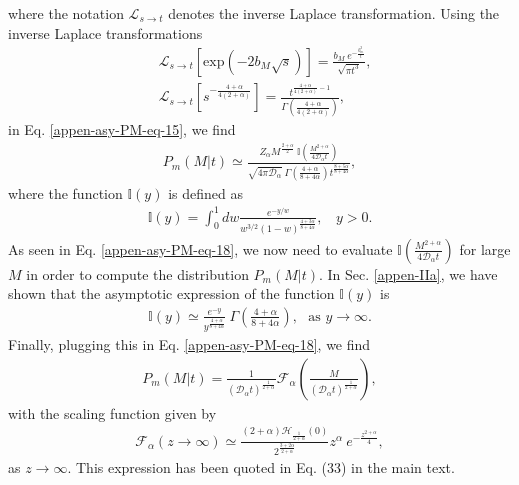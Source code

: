 \documentclass[superscriptaddress,amsmath,amssymb,aps,onecolumn]{revtex4}
\begin{document}
where the notation $\mathcal{L}_{s \to t}$ denotes the inverse Laplace transformation. Using the inverse Laplace transformations
\begin{align}
&\mathcal{L}_{s \to t}\left[ \text{exp} \left( -2b_M \sqrt{s} \right) \right] = \frac{b_M~e^{-\frac{b_m^2}{t}}}{\sqrt{\pi t^3}},
\label{appen-asy-PM-eq-16} \\
&\mathcal{L}_{s \to t} \left[ s^{-\frac{4+\alpha}{4(2+\alpha)}}\right] = \frac{t^{\frac{4+\alpha}{4(2+\alpha)}-1}}{\Gamma\left( \frac{4+\alpha}{4(2+\alpha)} \right) }, \label{appen-asy-PM-eq-17}
\end{align}
in Eq. \eqref{appen-asy-PM-eq-15}, we find
\begin{align}
P_m(M|t) \simeq \frac{Z_{\alpha} M^{\frac{2+\alpha}{2}}~\mathbb{I} \left( \frac{M^{2+\alpha}}{4 \mathcal{D}_{\alpha} t} \right)}{\sqrt{4 \pi \mathcal{D}_{\alpha}} ~\Gamma \left(\frac{4+\alpha}{8+4 \alpha} \right) t^{\frac{8+5\alpha}{8+4 \alpha}}}, 
\label{appen-asy-PM-eq-18}
\end{align} 
where the function $\mathbb{I}(y)$ is defined as
\begin{align}
\mathbb{I}(y) = \int _{0}^{1} dw \frac{e^{-y/w}}{w^{3/2} (1-w)^{\frac{4+3 \alpha}{8+4 \alpha}}},~~~~y>0.
\label{appen-asy-PM-eq-19}
\end{align}
As seen in Eq. \eqref{appen-asy-PM-eq-18}, we now need to evaluate $\mathbb{I} \left( \frac{M^{2+\alpha}}{4 \mathcal{D}_{\alpha} t} \right)$ for large $M$ in order to compute the distribution $P_m(M|t)$. In Sec. \ref{appen-IIa}, we have shown that the asymptotic expression of the function $\mathbb{I}(y)$ is
\begin{align}
\mathbb{I}(y) \simeq \frac{e^{-y}}{y^{\frac{4+\alpha}{8+4 \alpha}}}~\Gamma \left(\frac{4+\alpha}{8+4 \alpha} \right),~~~\text{as }y \to \infty.
\label{appen-asy-PM-eq-20}
\end{align}
Finally, plugging this in Eq. \eqref{appen-asy-PM-eq-18}, we find
\begin{align}
P_m(M|t) = \frac{1}{\left( \mathcal{D}_{\alpha} t\right)^{\frac{1}{2+\alpha}}} \mathcal{F}_{\alpha} \left( \frac{M}{\left( \mathcal{D}_{\alpha} t\right)^{\frac{1}{2+\alpha}}} \right),
\label{appen-asy-PM-eq-21}
\end{align}
with the scaling function given by
\begin{align}
\mathcal{F}_{\alpha} \left( z \to \infty \right)\simeq \frac{(2+\alpha)\mathcal{H}_{\frac{1}{2+\alpha}}(0) }{2^{\frac{3+2\alpha}{2+\alpha}}}  z^{\alpha} ~e^{-\frac{z^{2+\alpha}}{4} },
\label{appen-asy-PM-eq-22}
\end{align}
as $z \to \infty$. This expression has been quoted in Eq. (33) in the main text.
\end{document}
